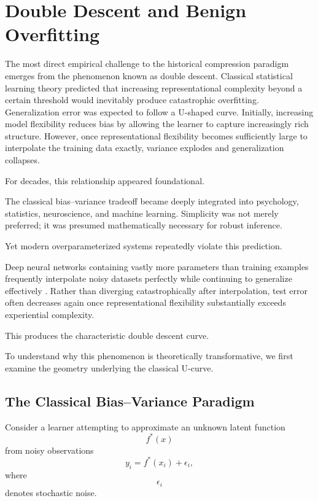 \documentclass[12pt,a4paper]{article}
\begin{document}

\section{Double Descent and Benign Overfitting}

The most direct empirical challenge to the historical compression paradigm emerges from the phenomenon known as double descent. Classical statistical learning theory predicted that increasing representational complexity beyond a certain threshold would inevitably produce catastrophic overfitting. Generalization error was expected to follow a U-shaped curve. Initially, increasing model flexibility reduces bias by allowing the learner to capture increasingly rich structure. However, once representational flexibility becomes sufficiently large to interpolate the training data exactly, variance explodes and generalization collapses.

For decades, this relationship appeared foundational.

The classical bias--variance tradeoff became deeply integrated into psychology, statistics, neuroscience, and machine learning. Simplicity was not merely preferred; it was presumed mathematically necessary for robust inference.

Yet modern overparameterized systems repeatedly violate this prediction.

Deep neural networks containing vastly more parameters than training examples frequently interpolate noisy datasets perfectly while continuing to generalize effectively \cite{Belkin2019,Nakkiran2020}. Rather than diverging catastrophically after interpolation, test error often decreases again once representational flexibility substantially exceeds experiential complexity.

This produces the characteristic double descent curve.

To understand why this phenomenon is theoretically transformative, we first examine the geometry underlying the classical U-curve.

\subsection{The Classical Bias--Variance Paradigm}

Consider a learner attempting to approximate an unknown latent function
\[
f^\ast(x)
\]
from noisy observations
\[
y_i = f^\ast(x_i) + \epsilon_i,
\]
where
\[
\epsilon_i
\]
denotes stochastic noise.
\end{document}

